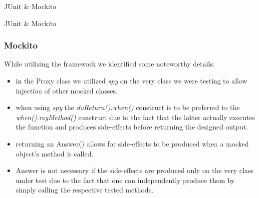 \documentclass{beamer}
\theoremstyle{definition}
\begin{document}
\begin{section}{JUnit \& Mockito}
\begin{subsection}{JUnit \& Mockito}
\begin{frame}
\begin{itemize}
\begin{itemize}
		\end{itemize}
				\end{itemize}
				\end{frame}
				
				\begin{frame}
					\frametitle{Mockito}
									
						While utilizing the framework we identified some noteworthy details:
						\begin{itemize}
							\item in the Proxy class we utilized \textit{spy} on the very class we were testing to allow injection of other mocked classes.
							\item when using \textit{spy} the \textit{doReturn().when()} construct is to be preferred to the \textit{when().myMethod()} construct  due to the fact that the latter actually executes the function and produces side-effects before returning the designed output.
							\item returning an Answer() allows for side-effects to be produced when a mocked object's method is called. 
							\item Answer is not necessary if the side-effects are produced only on the very class under test due to the fact that one can independently produce them by simply calling the respective tested methods.
						\end{itemize}
					\end{frame}
			\end{subsection}
		\end{section}
		
\end{document}
